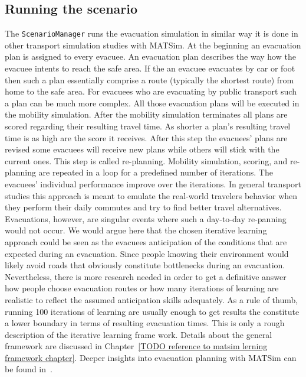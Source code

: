 \subsection{Running the scenario}
The \verb+ScenarioManager+ runs the evacuation simulation in similar way it is done in other transport simulation studies with MATSim. At the beginning an evacuation plan is assigned to every evacuee. An evacuation plan describes the way how the evacuee intents to reach the safe area. If the an evacuee evacuates by car or foot then such a plan essentially comprise a route (typically the shortest route) from home to the safe area. For evacuees who are evacuating by public transport such a plan can be much more complex. All those evacuation plans will be executed in the mobility simulation. After the mobility simulation terminates all plans are scored regarding their resulting travel time. As shorter a plan's resulting travel time is as high are the score it receives. After this step the evacuees' plans are revised some evacuees will receive new plans while others will stick with the current ones. This step is called re-planning. Mobility simulation, scoring, and re-planning are repeated in a loop for a predefined number of iterations. The evacuees' individual performance improve over the iterations. 
In general transport studies this approach is meant to emulate the real-world travelers behavior when they perform their daily commutes and try to find better travel alternatives. Evacuations, however, are singular events where such a day-to-day re-panning would not occur. We would argue here that the chosen iterative learning approach could be seen as the evacuees anticipation of the conditions that are expected during an evacuation. Since people knowing their  environment would likely avoid roads that obviously constitute bottlenecks during an evacuation. Nevertheless, there is more research needed in order to get a definitive answer how people choose evacuation routes or how many iterations of learning are realistic to reflect the assumed anticipation skills adequately. As a rule of thumb, running 100 iterations of learning are usually enough to get results the constitute a lower boundary in terms of resulting evacuation times.
This is only a rough description of the iterative learning frame work. Details about the general framework are discussed in Chapter~\ref{TODO reference to matsim lerning framework chapter}. Deeper insights into evacuation planning with MATSim can be found in~\citep{Laemmel2011Diss}.

